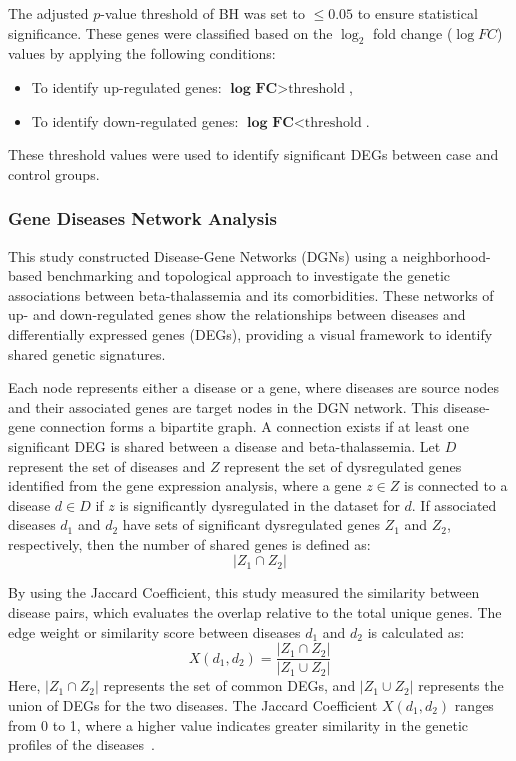 The adjusted $p$-value threshold of BH was set to $\leq 0.05$ to ensure statistical significance. These genes were classified based on the $\log_2$ fold change ($\log FC$) values by applying the following conditions:
\begin{itemize}
    \item To identify up-regulated genes: $\textbf{log FC} > \text{threshold}$,
    \item To identify down-regulated genes: $\textbf{log FC} < \text{threshold}$.
\end{itemize}

These threshold values were used to identify significant DEGs between case and control groups.

\vspace*{-\parskip} %
\subsubsection{Gene Diseases Network Analysis}
\label{sec:sec3_4_3}

This study constructed Disease-Gene Networks (DGNs) using a neighborhood-based benchmarking and topological approach to investigate the genetic associations between beta-thalassemia and its comorbidities. These networks of up- and down-regulated genes show the relationships between diseases and differentially expressed genes (DEGs), providing a visual framework to identify shared genetic signatures.

Each node represents either a disease or a gene, where diseases are source nodes and their associated genes are target nodes in the DGN network. This disease-gene connection forms a bipartite graph. A connection exists if at least one significant DEG is shared between a disease and beta-thalassemia. Let \(D\) represent the set of diseases and \(Z\) represent the set of dysregulated genes identified from the gene expression analysis, where a gene \(z \in Z\) is connected to a disease \(d \in D\) if \(z\) is significantly dysregulated in the dataset for \(d\). If associated diseases \(d_1\) and \(d_2\) have sets of significant dysregulated genes \(Z_1\) and \(Z_2\), respectively, then the number of shared genes is defined as:
\begin{equation}
|Z_1 \cap Z_2|
\label{eq:shared_genes}
\end{equation}

By using the Jaccard Coefficient, this study measured the similarity between disease pairs, which evaluates the overlap relative to the total unique genes. The edge weight or similarity score between diseases \(d_1\) and \(d_2\) is calculated as:
\begin{equation}
X(d_1, d_2) = \frac{|Z_1 \cap Z_2|}{|Z_1 \cup Z_2|}
\label{eq:jaccard}
\end{equation}
Here, \(|Z_1 \cap Z_2|\) represents the set of common DEGs, and \(|Z_1 \cup Z_2|\) represents the union of DEGs for the two diseases. The Jaccard Coefficient \(X(d_1, d_2)\) ranges from 0 to 1, where a higher value indicates greater similarity in the genetic profiles of the diseases~\cite{jaccard_ref}.

